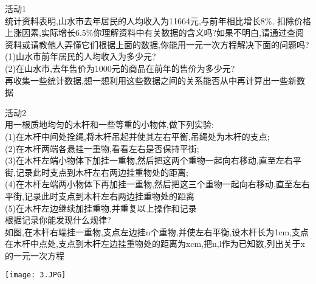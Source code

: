 \documentclass[11pt,apaper]{article}
\begin{document}
\begin{framed}
活动1\\

统计资料表明,山水市去年居民的人均收入为11664元,与前年相比增长8\%, 扣除价格上涨因素,实际增长6.5\%你理解资料中有关数据的含义吗?如果不明白,请通过查阅资料或请教他人弄懂它们根据上面的数据,你能用一元一次方程解决下面的问题吗?\\
(1)山水市前年居民的人均收入为多少元?\\
(2)在山水市,去年售价为1000元的商品在前年的售价为多少元?\\
再收集一些统计数据,想一想利用这些数据之间的关系能否从中再计算出一些新数据\\
\end{framed}

\begin{framed}
活动2\\

用一根质地均匀的木杆和一些等重的小物体,做下列实验:\\
(1)在木杆中间处拴绳,将木杆吊起并使其左右平衡,吊绳处为木杆的支点;\\
(2)在木杆两端各悬挂一重物,看看左右是否保持平街;\\
(3)在木杆左端小物体下加挂一重物,然后把这两个重物一起向右移动,直至左右平街,记录此时支点到木杆左右两边挂重物处的距离;\\
(4)在木杆左端两小物体下再加挂一重物,然后把这三个重物一起向右移动,直至左右平街,记录此时支点到木杆左右两边挂重物处的距离\\
(5)在木杆左边继续加挂重物,并重复以上操作和记录\\
根据记录你能发现什么规律?\\
如图,在木杆右端挂一重物,支点左边挂n个重物,并使左右平衡,设木杆长为1cm,支点在木杆中点处,支点到木杆左边挂重物处的距离为xcm,把n,l作为已知数,列出关于x的一元一次方程\\
\begin{center}
  \texttt{[image: 3.JPG]}\\
\end{center}
\end{framed}
\end{document}
